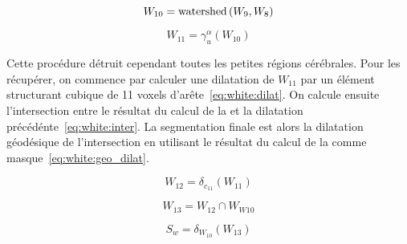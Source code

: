 \documentclass[\main/main.tex]{subfiles}
\begin{document}
\begin{equation}
\label{eq:white:watershed}
    W_{10} = \operatorname{\textnormal{watershed}}{}(W_9,W_8)
\end{equation}

\begin{equation}
\label{eq:white:open_volume}
    W_{11} = \gamma^{\alpha}_{u}(W_{10})
\end{equation}

%
Cette procédure détruit cependant toutes les petites régions cérébrales.
%
Pour les récupérer, on commence par calculer une dilatation de $W_{11}$ par un élément structurant cubique de 11 voxels d'arête~\eqref{eq:white:dilat}.
%
On calcule ensuite l'intersection entre le résultat du calcul de la \watershed{}
et la dilatation précédénte~\eqref{eq:white:inter}.
%
La segmentation finale est alors la dilatation géodésique de l'intersection en utilisant le résultat du calcul de la \watershed{} comme masque~\eqref{eq:white:geo_dilat}.

\begin{equation}
\label{eq:white:dilat}
    W_{12} = \delta_{c_{11}}(W_{11})
\end{equation}

\begin{equation}
\label{eq:white:inter}
    W_{13} = W_{12} \cap W_{W10}
\end{equation}

\begin{equation}
\label{eq:white:geo_dilat}
    S_w = \delta_{W_{10}}(W_{13})
\end{equation}
\end{document}
